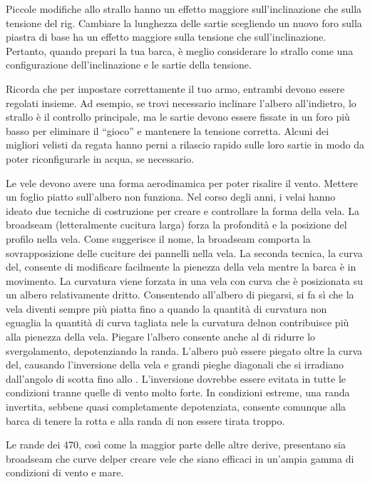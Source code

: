 Piccole modifiche allo strallo hanno un effetto maggiore sull'inclinazione che
sulla tensione del rig. Cambiare la lunghezza delle sartie scegliendo un nuovo
foro sulla piastra di base ha un effetto maggiore sulla tensione che
sull'inclinazione. Pertanto, quando prepari la tua barca, è meglio considerare
lo strallo come una configurazione dell'inclinazione e le sartie della tensione.

Ricorda che per impostare correttamente il tuo armo, entrambi devono essere
regolati insieme. Ad esempio, se trovi necessario inclinare l'albero
all'indietro, lo strallo è il controllo principale, ma le sartie devono essere
fissate in un foro più basso per eliminare il ``gioco'' e mantenere la tensione
corretta. Alcuni dei migliori velisti da regata hanno perni a rilascio rapido
sulle loro sartie in modo da poter riconfigurarle in acqua, se necessario.

Le vele devono avere una forma aerodinamica per poter risalire il vento. Mettere
un foglio piatto sull'albero non funziona. Nel corso degli anni, i velai hanno
ideato due tecniche di costruzione per creare e controllare la forma della vela.
La broadseam (letteralmente cucitura larga) forza la profondità e la posizione
del profilo nella vela. Come suggerisce il nome, la broadseam comporta la
sovrapposizione delle cuciture dei pannelli nella vela.
%
La seconda tecnica, la curva del\theluff, consente di modificare facilmente la
pienezza della vela mentre la barca è in movimento. La curvatura viene forzata
in una vela con \aluff curva che è posizionata su un albero relativamente
dritto. Consentendo all'albero di piegarsi, si fa sì che la vela diventi sempre
più piatta fino a quando la quantità di curvatura non eguaglia la quantità di
curva tagliata nel\theluff e la curvatura del\theluff non contribuisce più alla
pienezza della vela. Piegare l'albero consente anche al \leech di ridurre lo
svergolamento, depotenziando la randa. L'albero può essere piegato oltre la
curva del\theluff, causando l'inversione della vela e grandi pieghe diagonali
che si irradiano dall'angolo di scotta fino allo \spreader. L'inversione dovrebbe
essere evitata in tutte le condizioni tranne quelle di vento molto forte. In
condizioni estreme, una randa invertita, sebbene quasi completamente
depotenziata, consente comunque alla barca di tenere la rotta e alla randa di
non essere tirata troppo.

Le rande dei 470, così come la maggior parte delle altre derive, presentano sia
broadseam che curve del\theluff per creare vele che siano efficaci in
un'ampia gamma di condizioni di vento e mare.